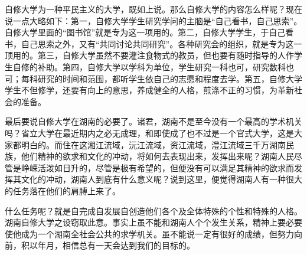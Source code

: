 自修大学为一种平民主义的大学，既如上说。那么自修大学的内容怎么样呢？现在说一点大略如下：第一，自修大学学生研究学问的主脑是“自己看书，自己思索”。自修大学里面的“图书馆”就是专为这一项用的。第二，自修大学学生，于自己看书，自己思索之外，又有“共同讨论共同研究”。各种研究会的组织，就是专为这一顶用的。第三，自修大学虽然不要灌注食物式的教员，但也要有随时指导的人作学生自修的补助。第四，自修大学以学科为单位，学生研究一科也可，研究数科也可；每科研究的时间和范围，都听学生依自己的志愿和程度去学。第五，自修大学学生不但修学，还要有向上的意思，养成健全的人格，煎涤不正的习惯，为革新社会的准备。

最后要说自修大学在湖南的必要了。诸君，湖南不是至今没有一个最高的学术机关吗？省立大学在最近期内之必无成理，和即使成了也不过是一个官式大学，这是大家都明白的。而住在这湘江流域，沅江流域，资江流域，澧江流域三千万湖南民族，他们精神的欲求和文化的冲动，将如何去表现出来，发挥出来呢？湖南人民尽管是峥嵘活泼如日升的，尽管是极有希望的，但便没有可以满足其精神的欲求而发挥其文化的冲动，湖南人到底有什么意义呢？说到这里，便觉得湖南人有一种很大的任务落在他们的肩膊上来了。

什么任务呢？就是自完成自发展自创造他们各个及全体特殊的个性和特殊的人格。湖南自修大学之设窃取此意。事实上虽不能和湖南人个个发生关系，精神上要必要使他成为一个湖南全社会公共的求学机关。虽不能说一定有很好的成绩，但努力向前，积以年月，相信总有一天会达到我们的目标的。

